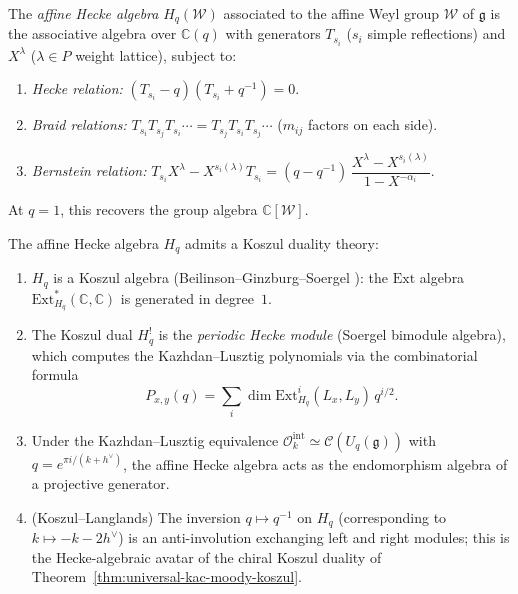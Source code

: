 \begin{definition}\label{def:affine-hecke}
The \emph{affine Hecke algebra} $H_q(\mathcal{W})$ associated to the
affine Weyl group $\mathcal{W}$ of $\mathfrak{g}$ is the associative
algebra over $\mathbb{C}(q)$ with generators $T_{s_i}$ ($s_i$ simple
reflections) and $X^\lambda$ ($\lambda \in P$ weight lattice),
subject to:
\begin{enumerate}[label=\textup{(\roman*)}]
\item \emph{Hecke relation:}
 $(T_{s_i} - q)(T_{s_i} + q^{-1}) = 0$.
\item \emph{Braid relations:}
 $T_{s_i}T_{s_j}T_{s_i}\cdots = T_{s_j}T_{s_i}T_{s_j}\cdots$
 ($m_{ij}$ factors on each side).
\item \emph{Bernstein relation:}
 $T_{s_i} X^\lambda - X^{s_i(\lambda)} T_{s_i}
 = (q - q^{-1})\,\dfrac{X^\lambda - X^{s_i(\lambda)}}{1 - X^{-\alpha_i}}$.
\end{enumerate}
At $q = 1$, this recovers the group algebra $\mathbb{C}[\mathcal{W}]$.
\end{definition}

\begin{proposition}
\label{prop:affine-hecke-kd}
The affine Hecke algebra $H_q$ admits a Koszul duality theory:
\begin{enumerate}[label=\textup{(\roman*)}]
\item $H_q$ is a Koszul algebra \textup{(}Beilinson--Ginzburg--Soergel
 \cite{BGS96}\textup{)}: the $\mathrm{Ext}$ algebra
 $\mathrm{Ext}^*_{H_q}(\mathbb{C}, \mathbb{C})$ is
 generated in degree~$1$.
\item The Koszul dual $H_q^!$ is the \emph{periodic Hecke module}
 (Soergel bimodule algebra), which computes the
 Kazhdan--Lusztig polynomials via the combinatorial
 formula
 \[
 P_{x,y}(q) = \sum_i \dim \mathrm{Ext}^i_{H_q}(L_x, L_y)\,
 q^{i/2}.
 \]
\item Under the Kazhdan--Lusztig equivalence
 $\mathcal{O}_k^{\mathrm{int}} \simeq \mathcal{C}(U_q(\mathfrak{g}))$
 with $q = e^{\pi i/(k + h^\vee)}$, the affine Hecke algebra acts as
 the endomorphism algebra of a projective generator.
\item \textup{(}Koszul--Langlands\textup{)} The inversion
 $q \mapsto q^{-1}$ on $H_q$ \textup{(}corresponding to
 $k \mapsto -k - 2h^\vee$\textup{)} is an anti-involution exchanging
 left and right modules; this is the Hecke-algebraic avatar of the
 chiral Koszul duality of Theorem~\textup{\ref{thm:universal-kac-moody-koszul}}.
\end{enumerate}
\end{proposition}

